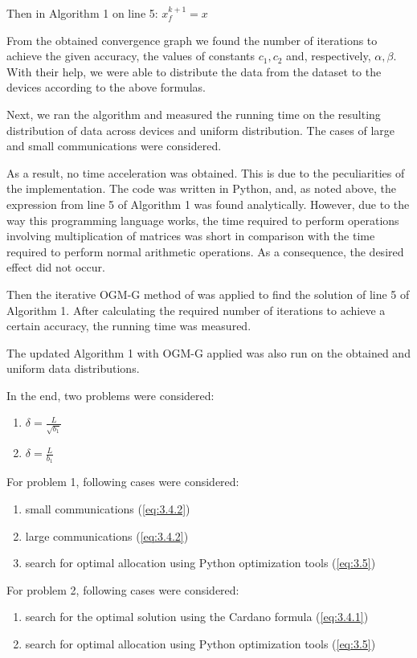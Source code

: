 \documentclass{article}
\begin{document}
Then in Algorithm 1 on line 5: $x_f^{k+1} = x$

From the obtained convergence graph we found the number of iterations to achieve the given accuracy, the values of constants $c_1, c_2$ and, respectively, $\alpha, \beta$. With their help, we were able to distribute the data from the dataset to the devices according to the above formulas. 

Next, we ran the algorithm and measured the running time on the resulting distribution of data across devices and uniform distribution. The cases of large and small communications were considered. 

As a result, no time acceleration was obtained. This is due to the peculiarities of the implementation. The code was written in Python, and, as noted above, the expression from line 5 of Algorithm 1 was found analytically. However, due to the way this programming language works, the time required to perform operations involving multiplication of matrices was short in comparison with the time required to perform normal arithmetic operations. As a consequence, the desired effect did not occur.

Then the iterative OGM-G method of \cite{kim2021optimizing} was applied to find the solution of line 5 of Algorithm 1. After calculating the required number of iterations to achieve a certain accuracy, the running time was measured.

The updated Algorithm 1 with OGM-G applied was also run on the obtained and uniform data distributions.

In the end, two problems were considered: 
\begin{enumerate}
    \item $\delta = \frac{L}{\sqrt{b_1}}$ 
    \item $\delta = \frac{L}{b_1}$
\end{enumerate}

For problem 1, following cases were considered:
\begin{enumerate}
    \item small communications (\ref{eq:3.4.2})
    \item large communications (\ref{eq:3.4.2})
    \item search for optimal allocation using Python optimization tools (\ref{eq:3.5})
\end{enumerate}

For problem 2, following cases were considered:
\begin{enumerate}
    \item search for the optimal solution using the Cardano formula (\ref{eq:3.4.1})
    \item search for optimal allocation using Python optimization tools (\ref{eq:3.5})
\end{enumerate}
\end{document}
